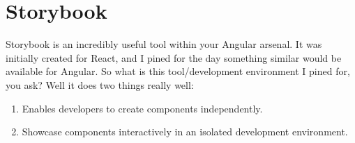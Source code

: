 \chapter{Storybook}
Storybook is an incredibly useful tool within your Angular arsenal. It was initially created for React, and I pined for the day something similar would be available for Angular. So what is this tool/development environment I pined for, you ask? Well it does two things really well: 

\begin{enumerate}
  \item Enables developers to create components independently. 
  \item Showcase components interactively in an isolated development environment.
\end{enumerate}

